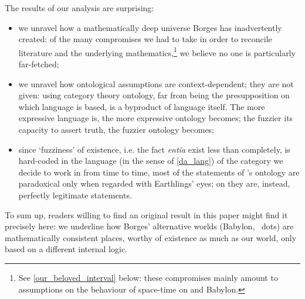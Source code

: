 The results of our analysis are surprising:
\begin{itemize}
  \item we unravel how a mathematically deep universe Borges has inadvertently created: of the many compromises we had to take in order to reconcile literature and the underlying mathematics,\footnote{See \autoref{our_beloved_interval} below: these compromises mainly amount to assumptions on the behaviour of space-time on \tlon and Babylon.} we believe no one is particularly far-fetched;
  \item we unravel how ontological assumptions are context-dependent; they are not given: using category theory ontology, far from being the presupposition on which language is based, is a byproduct of language itself. The more expressive language is, the more expressive ontology becomes; the fuzzier its capacity to assert truth, the fuzzier ontology becomes;
  \item since `fuzziness' of existence, i.e. the fact \emph{entia} exist less than completely, is hard-coded in the language (in the sense of \autoref{da_lang}) of the category we decide to work in from time to time, most of the statements of \tlon's ontology are paradoxical only when regarded with Earthlings' eyes; on \tlon they are, instead, perfectly legitimate statements.
\end{itemize}
To sum up, readers willing to find an original result in this paper might find it precisely here: we underline how Borges' alternative worlds (Babylon, \tlon \ dots) are mathematically consistent places, worthy of existence as much as our world, only based on a different internal logic. 

